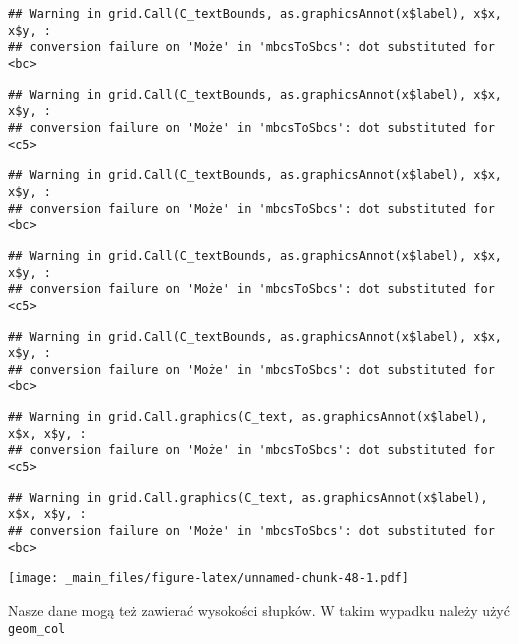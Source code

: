 \documentclass[
]{book}
\begin{document}
\begin{verbatim}
## Warning in grid.Call(C_textBounds, as.graphicsAnnot(x$label), x$x, x$y, :
## conversion failure on 'Może' in 'mbcsToSbcs': dot substituted for <bc>
\end{verbatim}

\begin{verbatim}
## Warning in grid.Call(C_textBounds, as.graphicsAnnot(x$label), x$x, x$y, :
## conversion failure on 'Może' in 'mbcsToSbcs': dot substituted for <c5>
\end{verbatim}

\begin{verbatim}
## Warning in grid.Call(C_textBounds, as.graphicsAnnot(x$label), x$x, x$y, :
## conversion failure on 'Może' in 'mbcsToSbcs': dot substituted for <bc>
\end{verbatim}

\begin{verbatim}
## Warning in grid.Call(C_textBounds, as.graphicsAnnot(x$label), x$x, x$y, :
## conversion failure on 'Może' in 'mbcsToSbcs': dot substituted for <c5>
\end{verbatim}

\begin{verbatim}
## Warning in grid.Call(C_textBounds, as.graphicsAnnot(x$label), x$x, x$y, :
## conversion failure on 'Może' in 'mbcsToSbcs': dot substituted for <bc>
\end{verbatim}

\begin{verbatim}
## Warning in grid.Call.graphics(C_text, as.graphicsAnnot(x$label), x$x, x$y, :
## conversion failure on 'Może' in 'mbcsToSbcs': dot substituted for <c5>
\end{verbatim}

\begin{verbatim}
## Warning in grid.Call.graphics(C_text, as.graphicsAnnot(x$label), x$x, x$y, :
## conversion failure on 'Może' in 'mbcsToSbcs': dot substituted for <bc>
\end{verbatim}

\texttt{[image: \_main\_files/figure-latex/unnamed-chunk-48-1.pdf]}

Nasze dane mogą też zawierać wysokości słupków. W takim wypadku należy użyć \texttt{geom\_col}
\end{document}
